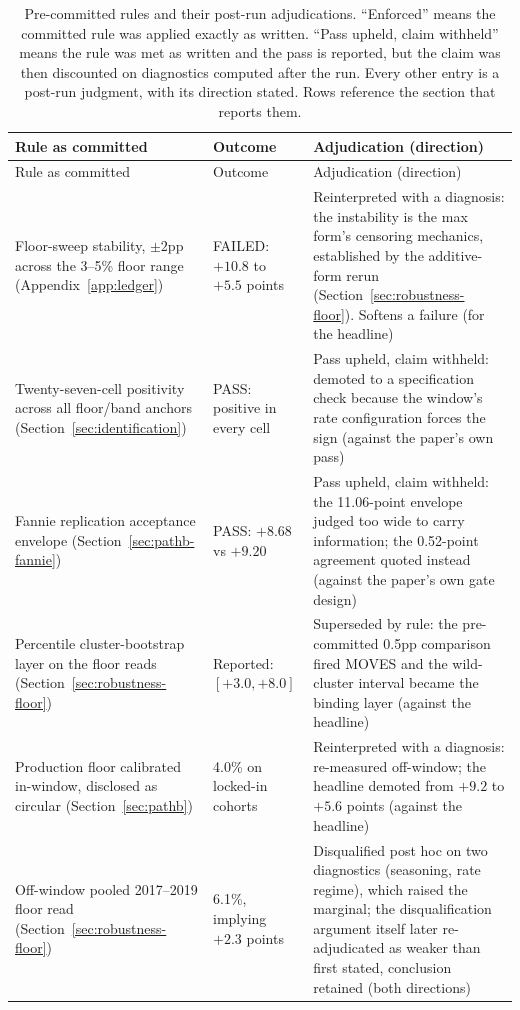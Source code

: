 \documentclass[12pt]{article}
\begin{document}
{\scriptsize
\begin{longtable}{@{}p{4.4cm}p{4.2cm}p{5.6cm}@{}}
\caption{Pre-committed rules and their post-run adjudications. ``Enforced'' means the committed rule was applied exactly as written. ``Pass upheld, claim withheld'' means the rule was met as written and the pass is reported, but the claim was then discounted on diagnostics computed after the run. Every other entry is a post-run judgment, with its direction stated. Rows reference the section that reports them.}
\label{tab:verdicts}\\
\toprule
Rule as committed & Outcome & Adjudication (direction) \\
\midrule
\endfirsthead
\toprule
Rule as committed & Outcome & Adjudication (direction) \\
\midrule
\endhead
Floor-sweep stability, $\pm 2$pp across the 3--5\% floor range (Appendix~\ref{app:ledger}) & FAILED: $+10.8$ to $+5.5$ points & Reinterpreted with a diagnosis: the instability is the max form's censoring mechanics, established by the additive-form rerun (Section~\ref{sec:robustness-floor}). Softens a failure (for the headline) \\
Twenty-seven-cell positivity across all floor/band anchors (Section~\ref{sec:identification}) & PASS: positive in every cell & Pass upheld, claim withheld: demoted to a specification check because the window's rate configuration forces the sign (against the paper's own pass) \\
Fannie replication acceptance envelope (Section~\ref{sec:pathb-fannie}) & PASS: $+8.68$ vs $+9.20$ & Pass upheld, claim withheld: the 11.06-point envelope judged too wide to carry information; the 0.52-point agreement quoted instead (against the paper's own gate design) \\
Percentile cluster-bootstrap layer on the floor reads (Section~\ref{sec:robustness-floor}) & Reported: $[+3.0, +8.0]$ & Superseded by rule: the pre-committed 0.5pp comparison fired MOVES and the wild-cluster interval became the binding layer (against the headline) \\
Production floor calibrated in-window, disclosed as circular (Section~\ref{sec:pathb}) & 4.0\% on locked-in cohorts & Reinterpreted with a diagnosis: re-measured off-window; the headline demoted from $+9.2$ to $+5.6$ points (against the headline) \\
Off-window pooled 2017--2019 floor read (Section~\ref{sec:robustness-floor}) & 6.1\%, implying $+2.3$ points & Disqualified post hoc on two diagnostics (seasoning, rate regime), which raised the marginal; the disqualification argument itself later re-adjudicated as weaker than first stated, conclusion retained (both directions) \\

\end{longtable}}
\end{document}
